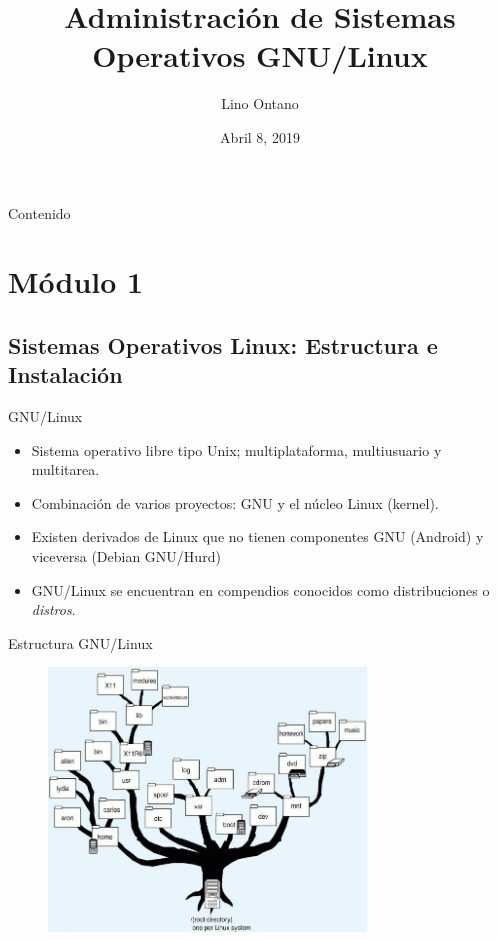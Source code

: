 \documentclass{beamer}
\title[Administración GNU/Linux]{Administración de Sistemas Operativos GNU/Linux}
\author{Lino Ontano}
\date{Abril 8, 2019}
\begin{document}
\begin{frame}
  \titlepage
\end{frame}

\begin{frame}{Contenido}
  \tableofcontents
\end{frame}

\section{Módulo 1}
\subsection{Sistemas Operativos Linux: Estructura e Instalación}
\begin{frame}{GNU/Linux}
\begin{itemize}
\item Sistema operativo libre tipo Unix; multiplataforma, multiusuario y multitarea.
\item Combinación de varios proyectos: GNU y el núcleo Linux (kernel).
\item Existen derivados de Linux que no tienen componentes GNU (Android) y viceversa (Debian GNU/Hurd)
\item GNU/Linux se encuentran en compendios conocidos como distribuciones o \textit{distros}.
\end{itemize}
\end{frame}
\begin{frame}{Estructura GNU/Linux}
\begin{figure}
	\includegraphics[height=7cm]{img/estructura.jpg}
\end{figure}
\end{frame}
\end{document}
